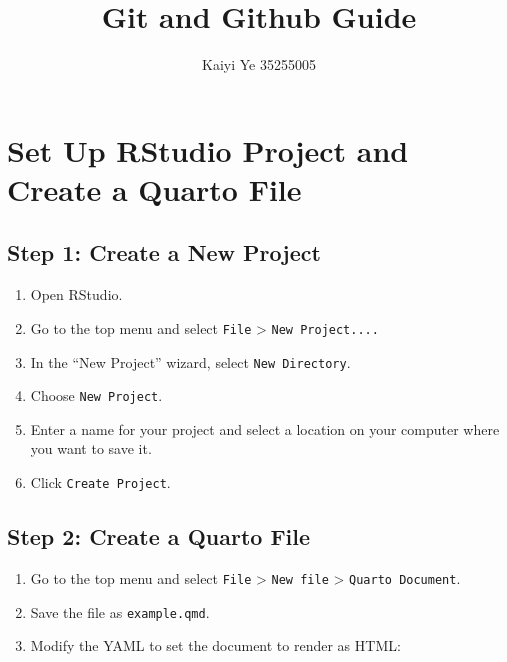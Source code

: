 \documentclass[
  11pt,
  letterpaper,
  DIV=11,
  numbers=noendperiod]{scrartcl}
\title{Git and Github Guide}
\author{Kaiyi Ye 35255005}
\date{}
\providecommand{\tightlist}{%
  \setlength{\itemsep}{0pt}\setlength{\parskip}{0pt}}\usepackage{longtable,booktabs,array}
\let\textttOrig\texttt
\renewcommand{\texttt}[1]{\textttOrig{\colorbox{codebggray}{\textcolor{codefontcolor}{#1}}}}
\renewcommand*\contentsname{Table of contents}
\newcommand\contentsname{Table of contents}
\begin{document}
\maketitle

\renewcommand*\contentsname{Table of contents}
{
\hypersetup{linkcolor=}
\setcounter{tocdepth}{1}
\tableofcontents
}

\newpage

\section{Set Up RStudio Project and Create a Quarto
File}\label{set-up-rstudio-project-and-create-a-quarto-file}

\subsection{Step 1: Create a New
Project}\label{step-1-create-a-new-project}

\begin{enumerate}
\def\labelenumi{\arabic{enumi}.}
\tightlist
\item
  Open RStudio.
\item
  Go to the top menu and select \texttt{File} \textgreater{}
  \texttt{New\ Project....}
\item
  In the ``New Project'' wizard, select \texttt{New\ Directory}.
\item
  Choose \texttt{New\ Project}.
\item
  Enter a name for your project and select a location on your computer
  where you want to save it.
\item
  Click \texttt{Create\ Project}.
\end{enumerate}

\subsection{Step 2: Create a Quarto
File}\label{step-2-create-a-quarto-file}

\begin{enumerate}
\def\labelenumi{\arabic{enumi}.}
\tightlist
\item
  Go to the top menu and select \texttt{File} \textgreater{}
  \texttt{New\ file} \textgreater{} \texttt{Quarto\ Document}.
\item
  Save the file as \texttt{example.qmd}.
\item
  Modify the YAML to set the document to render as HTML:
\end{enumerate}
\end{document}
